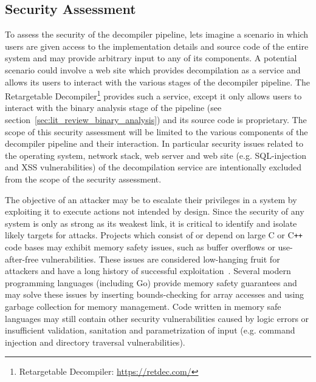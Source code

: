 
\subsection{Security Assessment}
\label{sec:ver_security_assessment}

To assess the security of the decompiler pipeline, lets imagine a scenario in which users are given access to the implementation details and source code of the entire system and may provide arbitrary input to any of its components. A potential scenario could involve a web site which provides decompilation as a service and allows its users to interact with the various stages of the decompiler pipeline. The Retargetable Decompiler\footnote{Retargetable Decompiler: \url{https://retdec.com/}} provides such a service, except it only allows users to interact with the binary analysis stage of the pipeline (see section~\ref{sec:lit_review_binary_analysis}) and its source code is proprietary. The scope of this security assessment will be limited to the various components of the decompiler pipeline and their interaction. In particular security issues related to the operating system, network stack, web server and web site (e.g. SQL-injection and XSS vulnerabilities) of the decompilation service are intentionally excluded from the scope of the security assessment.

The objective of an attacker may be to escalate their privileges in a system by exploiting it to execute actions not intended by design. Since the security of any system is only as strong as its weakest link, it is critical to identify and isolate likely targets for attacks. Projects which consist of or depend on large C or C\texttt{++} code bases may exhibit memory safety issues, such as buffer overflows or use-after-free vulnerabilities. These issues are considered low-hanging fruit for attackers and have a long history of successful exploitation~\cite{for_fun_and_profit}. Several modern programming languages (including Go) provide memory safety guarantees and may solve these issues by inserting bounds-checking for array accesses and using garbage collection for memory management. Code written in memory safe languages may still contain other security vulnerabilities caused by logic errors or insufficient validation, sanitation and parametrization of input (e.g. command injection and directory traversal vulnerabilities).

